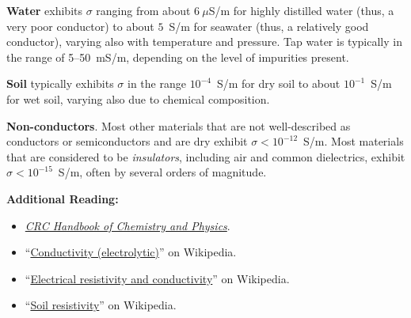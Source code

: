 {\bf Water} 
exhibits $\sigma$ ranging from 
about $6~\mu$S/m for highly distilled water (thus, a very poor conductor) to %
about $5$~S/m for seawater (thus, a relatively good conductor), varying also with temperature and pressure. %
Tap water is typically in the range of 5--50~mS/m, depending on the level of impurities present. %

{\bf Soil} 
typically exhibits $\sigma$ in the range $10^{-4}$~S/m for dry soil to about $10^{-1}$~S/m for wet soil, varying also due to chemical composition. %
  
{\bf Non-conductors}.  Most other materials that are not well-described as conductors or semiconductors and are dry exhibit $\sigma < 10^{-12}$~S/m.  
Most materials that are considered to be \emph{insulators}, including air and common dielectrics, exhibit $\sigma < 10^{-15}$~S/m, often by several orders of magnitude. 


{\bf Additional Reading:}
\begin{itemize}
\item \href{http://hbcponline.com}{\emph{CRC Handbook of Chemistry and Physics}}.
\item ``\href{https://en.wikipedia.org/wiki/Conductivity_(electrolytic)}{Conductivity (electrolytic)}'' on Wikipedia.
\item ``\href{https://en.wikipedia.org/wiki/Electrical_resistivity_and_conductivity}{Electrical resistivity and conductivity}'' on Wikipedia.
\item ``\href{https://en.wikipedia.org/wiki/Soil_resistivity}{Soil resistivity}'' on Wikipedia.
\end{itemize}



